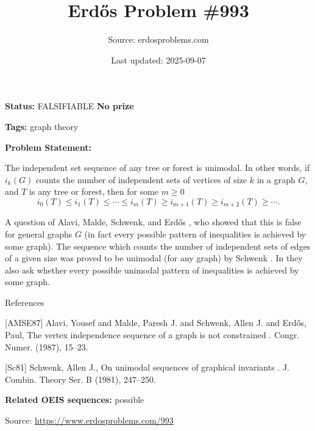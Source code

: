 \documentclass{article}
\title{Erd\H{o}s Problem \#993}
\date{Last updated: 2025-09-07}
\author{Source: erdosproblems.com}
\begin{document}
\maketitle

\noindent\textbf{Status:} FALSIFIABLE \quad \textbf{No prize}

\noindent\textbf{Tags:} graph theory

\medskip

\noindent\textbf{Problem Statement:}

The independent set sequence of any tree or forest is unimodal. In other words, if $i_k(G)$ counts the number of independent sets of vertices of size $k$ in a graph $G$, and $T$ is any tree or forest, then for some $m\geq 0$ $$i_{0}(T)\leq i_{1}(T)\leq\cdots\leq i_{m}(T)\geq i_{m+1}(T)\geq i_{m+2}(T)\geq\cdots.$$




A question of Alavi, Malde, Schwenk, and Erd\H{o}s \cite{AMSE87}, who showed that this is false for general graphs $G$ (in fact every possible pattern of inequalities is achieved by some graph). The sequence which counts the number of independent sets of edges of a given size was proved to be unimodal (for any graph) by Schwenk \cite{Sc81}. In \cite{AMSE87} they also ask whether every possible unimodal pattern of inequalities is achieved by some graph.




References

[AMSE87] Alavi, Yousef and Malde, Paresh J. and Schwenk, Allen J. and Erd\H{o}s, Paul, The vertex independence sequence of a graph is not constrained . Congr. Numer. (1987), 15--23.

[Sc81] Schwenk, Allen J., On unimodal sequences of graphical invariants . J. Combin. Theory Ser. B (1981), 247--250.

\noindent\textbf{Related OEIS sequences:} possible

\bigskip
\noindent\small{Source: \url{https://www.erdosproblems.com/993}}
\end{document}
